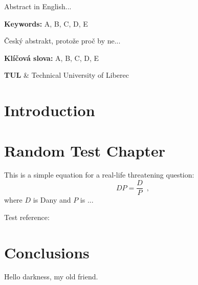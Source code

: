 \documentclass[FM,noheader,EN]{tulthesis}
\begin{document}
\TULfooternopage
\nofootaddress




\begin{abstractEN}[wide]
Abstract in English...

\vspace{0.5cm}
\noindent\textbf{Keywords:}
A, B, C, D, E
\end{abstractEN}

\clearpage

\begin{abstractCZ}[wide]
Český abstrakt, protože proč by ne...

\vspace{0.5cm}
\noindent\textbf{Klíčová slova:}
A, B, C, D, E
\end{abstractCZ}
\clearpage


\TULfooter
\tableofcontents
\clearpage


\begin{abbrList}
\textbf{TUL} & Technical University of Liberec \\
\end{abbrList}


\chapter*{Introduction}


\chapter{Random Test Chapter}
This is a simple equation for a real-life threatening question: 
\begin{equation}
\label{eq_dp}
	DP = \frac{D}{P} \enspace,
\end{equation}
where $D$ is Dany and $P$ is ...

Test reference: \cite{SIGMAP16}


\chapter{Conclusions}
Hello darkness, my old friend.
\end{document}
